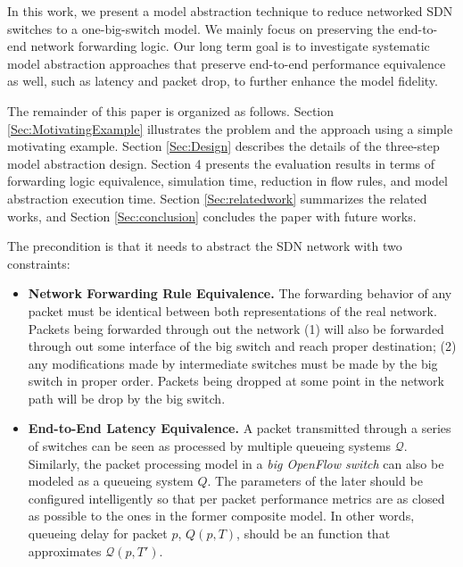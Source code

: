 In this work, we present a model abstraction technique to reduce networked SDN switches to a one-big-switch model. We mainly focus on preserving the end-to-end network forwarding logic.
Our long term goal is to investigate systematic model abstraction approaches that preserve end-to-end performance equivalence as well, such as latency and packet drop, to further enhance the model fidelity.

The remainder of this paper is organized as follows. Section  \ref{Sec:MotivatingExample} illustrates the problem and the approach using a simple motivating example.
Section \ref{Sec:Design} describes the details of the three-step model abstraction design.
Section 4 presents the evaluation results in terms of forwarding logic equivalence, simulation time, reduction in flow rules, and model abstraction execution time.
Section \ref{Sec:relatedwork} summarizes the related works, and Section \ref{Sec:conclusion} concludes the paper with future works.


The precondition is that it needs to abstract the SDN network with two constraints:
\begin{itemize}
\item \textbf{Network Forwarding Rule Equivalence.}
        The forwarding behavior of any packet must be identical
        between both representations of the real network. Packets being
        forwarded through out the network (1) will also be forwarded through out
        some interface of the big switch and reach proper destination;
        (2) any modifications made by intermediate switches must be made by the
        big switch in proper order.
        Packets being dropped at some point in the network path will be drop by the
        big switch.
\item \textbf{End-to-End Latency Equivalence.}
        A packet transmitted through a series of
        switches can be seen as processed by multiple queueing systems $\mathcal{Q}$.
        Similarly, the packet processing model in a \emph{big OpenFlow switch} can
        also be modeled as a queueing system $Q$.
        The parameters of the later should be configured intelligently
        so that per packet performance metrics are as closed as possible to the ones
        in the former composite model.
        In other words, queueing delay for packet $p$, $Q(p, T)$, should be an
        function that approximates $\mathcal{Q}(p, T')$.
\end{itemize}
\fi
